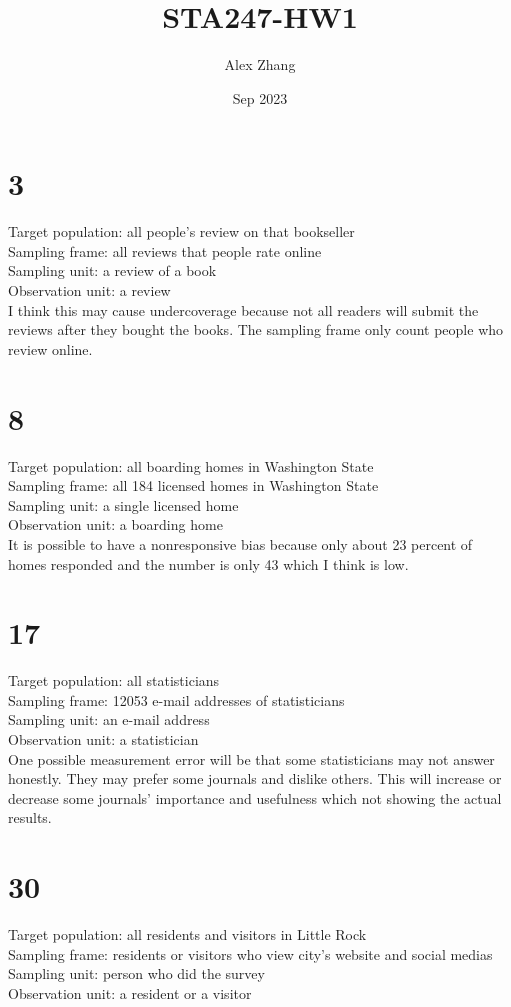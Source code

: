 \documentclass{article}
\title{STA247-HW1}
\author{Alex Zhang}
\date{Sep 2023}
\begin{document}
\maketitle
\section*{3}
Target population: all people's review on that bookseller\\
Sampling frame: all reviews that people rate online\\
Sampling unit: a review of a book\\
Observation unit: a review\\

I think this may cause undercoverage because not all readers will submit the reviews after they bought the books.
The sampling frame only count people who review online.
\section*{8}
Target population: all boarding homes in Washington State\\
Sampling frame: all 184 licensed homes in Washington State\\
Sampling unit: a single licensed home\\
Observation unit: a boarding home\\

It is possible to have a nonresponsive bias because only about 23 percent of homes responded and the number is only 43 which I think is low.



\section*{17}
Target population: all statisticians\\
Sampling frame: 12053 e-mail addresses of statisticians\\
Sampling unit: an e-mail address\\
Observation unit: a statistician\\

One possible measurement error will be that some statisticians may not answer honestly. 
They may prefer some journals and dislike others.
This will increase or decrease some journals' importance and usefulness which not showing the actual results.



\section*{30}
Target population: all residents and visitors in Little Rock\\
Sampling frame: residents or visitors who view city's website and social medias \\
Sampling unit: person who did the survey\\
Observation unit: a resident or a visitor\\
\end{document}
